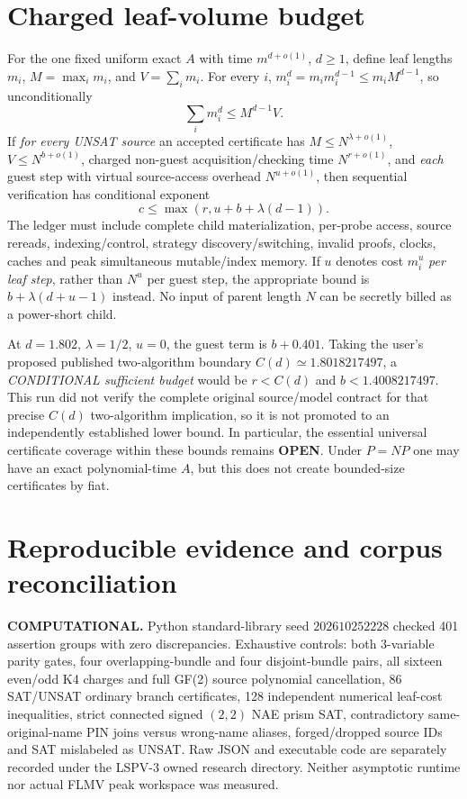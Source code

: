 \documentclass[11pt]{article}
\begin{document}
\section{Charged leaf-volume budget}
For the one fixed uniform exact $A$ with time
$m^{d+o(1)}$, $d\ge1$, define leaf lengths
$m_i$, $M=\max_i m_i$, and $V=\sum_i m_i$.
For every $i$, $m_i^d=m_i m_i^{d-1}\le m_i M^{d-1}$,
so unconditionally
\[
\boxed{\sum_i m_i^d\le M^{d-1}V.}
\]
If \emph{for every UNSAT source} an accepted certificate
has $M\le N^{\lambda+o(1)}$, $V\le N^{b+o(1)}$,
charged non-guest acquisition/checking time
$N^{r+o(1)}$, and \emph{each} guest step with virtual
source-access overhead $N^{u+o(1)}$,
then sequential verification has conditional exponent
\[
\boxed{c\le\max(r,u+b+\lambda(d-1)).}
\]
The ledger must include complete child materialization,
per-probe access, source rereads, indexing/control,
strategy discovery/switching, invalid proofs, clocks,
caches and peak simultaneous mutable/index memory.
If $u$ denotes cost $m_i^u$ \emph{per leaf step},
rather than $N^u$ per guest step, the appropriate
bound is $b+\lambda(d+u-1)$ instead.
No input of parent length $N$ can be secretly billed as
a power-short child.

At $d=1.802$, $\lambda=1/2$, $u=0$, the guest term
is $b+0.401$. Taking the user's proposed published
two-algorithm boundary $C(d)\simeq1.8018217497$,
a \emph{CONDITIONAL sufficient budget} would be
$r<C(d)$ and $b<1.4008217497$.
This run did not verify the complete original source/model
contract for that precise $C(d)$ two-algorithm implication,
so it is not promoted to an independently established lower
bound. In particular, the essential universal certificate
coverage within these bounds remains \textbf{OPEN}.
Under $P=NP$ one may have an exact polynomial-time $A$,
but this does not create bounded-size certificates by fiat.

\section{Reproducible evidence and corpus reconciliation}
\textbf{COMPUTATIONAL.} Python standard-library seed
$202610252228$ checked 401 assertion groups with zero
discrepancies. Exhaustive controls: both 3-variable parity
gates, four overlapping-bundle and four disjoint-bundle
pairs, all sixteen even/odd K4 charges and full GF(2)
source polynomial cancellation, 86 SAT/UNSAT ordinary
branch certificates, 128 independent numerical
leaf-cost inequalities, strict connected signed
$(2,2)$ NAE prism SAT, contradictory same-original-name
PIN joins versus wrong-name aliases, forged/dropped
source IDs and SAT mislabeled as UNSAT.
Raw JSON and executable code are separately recorded
under the LSPV-3 owned research directory.
Neither asymptotic runtime nor actual FLMV peak workspace
was measured.
\end{document}
